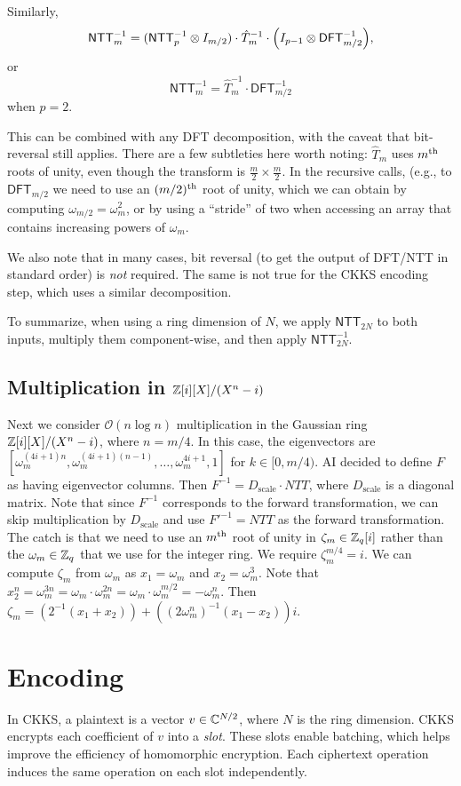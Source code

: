 \documentclass[../fheimpl.tex]{subfiles}
\begin{document}
Similarly,
\[\mathsf{NTT}^{-1}_m = (\mathsf{NTT}^{-1}_p\otimes I_{m/2})\cdot \hat{T}^{-1}_m\cdot \parens*{I_{p-1}\otimes \mathsf{DFT}^{-1}_{m/2}},\]
or
\[\mathsf{NTT}_m^{-1} = \hat{T}_m^{-1}\cdot \mathsf{DFT}_{m/2}^{-1}\]
when $p=2$.

This can be combined with any DFT decomposition, with the caveat that bit-reversal still applies.
There are a few subtleties here worth noting: $\hat{T}_m$ uses $m^{\mathrm{th}}$ roots of unity, even though the transform is $\frac{m}{2}\times\frac{m}{2}$. In the recursive calls, (e.g., to $\mathsf{DFT}_{m/2}$ we need to use an $(m/2)^{\mathrm{th}}$ root of unity, which we can obtain by computing $\omega_{m/2}=\omega_m^2$, or by using a ``stride'' of two when accessing an array that contains increasing powers of $\omega_m$. 

We also note that in many cases, bit reversal (to get the output of DFT/NTT in standard order) is \emph{not} required. The same is not true for the CKKS encoding step, which uses a similar decomposition.

To summarize, when using a ring dimension of $N$, we apply $\mathsf{NTT}_{2N}$ to both inputs, multiply them component-wise, and then apply $\mathsf{NTT}^{-1}_{2N}$.

\subsection{Multiplication in $\mathbb{Z}[i][X]/(X^n-i)$}
Next we consider $\mathcal{O}(n\log{n})$ multiplication in the Gaussian ring $\mathbb{Z}[i][X]/(X^n-i)$, where $n=m/4$. In this case, the eigenvectors are $[\omega_m^{(4i+1)n}, \omega_m^{(4i+1)(n-1)}, \ldots, \omega_m^{4i+1},1]$ for $k\in[0,m/4)$. AI decided to define $F$ as having eigenvector columns. Then $F^{-1} = D_\mathrm{scale}\cdot NTT$, where $D_\mathrm{scale}$ is a diagonal matrix. Note that since $F^{-1}$ corresponds to the forward transformation, we can skip multiplication by $D_\mathrm{scale}$ and use $F'^{-1}=NTT$ as the forward transformation. The catch is that we need to use an $m^{\mathrm{th}}$ root of unity in $\zeta_m\in \mathbb{Z}_q[i]$ rather than the $\omega_m\in\mathbb{Z}_q$ that we use for the integer ring. We require $\zeta_m^{m/4} = i$. We can compute $\zeta_m$ from $\omega_m$ as $x_1 = \omega_m$ and $x_2 = \omega_m^3$. Note that $x_2^n = \omega_m^{3n} = \omega_m\cdot \omega_m^{2n} = \omega_m\cdot \omega_m^{m/2} = -\omega_m^n$. Then $\zeta_m = (2^{-1}(x_1+x_2)) + ((2\omega_m^n)^{-1}(x_1-x_2))i$.

\section{Encoding}
\label{sec:ckksencoding}
    In CKKS, a plaintext is a vector $v\in \mathbb{C}^{N/2}$, where $N$ is the ring dimension. CKKS encrypts each coefficient of $v$ into a \emph{slot}. These slots enable batching, which helps improve the efficiency of homomorphic encryption. Each ciphertext operation induces the same operation on each slot independently.	
	
\end{document}
